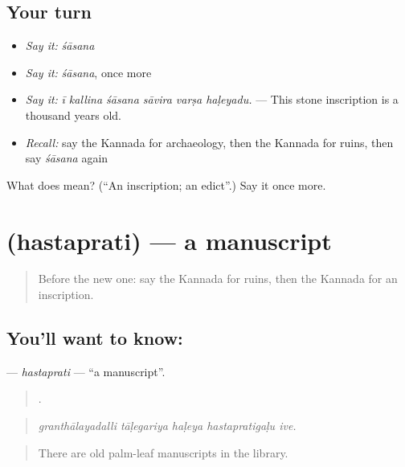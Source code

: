 \subsection*{Your turn}
\begin{itemize}
\raggedright
  \item \emph{Say it:} \emph{śāsana}
  \item \emph{Say it:} \emph{śāsana}, once more
  \item \emph{Say it:} \emph{ī kallina śāsana sāvira varṣa haḷeyadu.} — This stone inscription is a thousand years old.
  \item \emph{Recall:} say the Kannada for archaeology, then the Kannada for ruins, then say \emph{śāsana} again
\end{itemize}

\begin{tcolorbox}[breakable,colback=teal!4,colframe=teal!35!black,title={Before you move on}]
What does  mean? (\textquotedblleft{}An inscription; an edict\textquotedblright{}.) Say it once more.
\end{tcolorbox}
\section[\texorpdfstring{\kn{ಹಸ್ತಪ್ರತಿ} (hastaprati)}{ಹಸ್ತಪ್ರತಿ (hastaprati)}]{ (hastaprati) — a manuscript}

\label{lesson:KA-C355-hastaprati}



\begin{quote}
Before the new one: say the Kannada for ruins, then the Kannada for an inscription.
\end{quote}

\subsection*{You'll want to know: }
\textbf{} — \emph{hastaprati} — \textquotedblleft{}a manuscript\textquotedblright{}.

\begin{quote}
    .
\end{quote}

\begin{quote}
\emph{granthālayadalli tāḷegariya haḷeya hastapratigaḷu ive.}
\end{quote}

\begin{quote}
There are old palm-leaf manuscripts in the library.
\end{quote}

